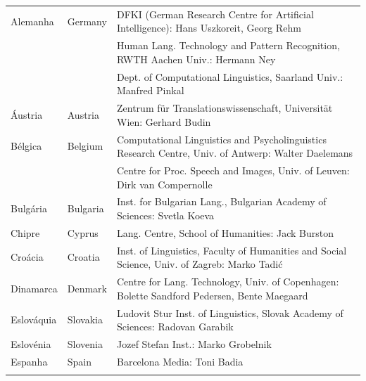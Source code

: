 \cleardoublepage

\appendix
{}



  
\cleardoublepage

\label{metanetmembers}

\small
\begin{longtable}{llp{105mm}}
  Alemanha & \textcolor{grey1}{Germany} & DFKI (German Research Centre for Artificial Intelligence): Hans Uszkoreit, Georg Rehm \\ \addlinespace
  & & Human Lang. Technology and Pattern Recognition, RWTH Aachen Univ.: Hermann Ney \\ \addlinespace
  & & Dept. of Computational Linguistics, Saarland Univ.: Manfred Pinkal \\ \addlinespace 
  Áustria & \textcolor{grey1}{Austria} & Zentrum für Translationswissenschaft, Universität Wien: Gerhard Budin \\ \addlinespace 
  Bélgica & \textcolor{grey1}{Belgium} & Computational Linguistics and Psycholinguistics Research Centre, Univ. of Antwerp: Walter Daelemans \\ \addlinespace
  & & Centre for Proc. Speech and Images, Univ. of Leuven: Dirk van Compernolle \\ \addlinespace
  Bulgária & \textcolor{grey1}{Bulgaria} & Inst. for Bulgarian Lang., Bulgarian Academy of Sciences: Svetla Koeva \\ \addlinespace
  Chipre & \textcolor{grey1}{Cyprus} & Lang. Centre, School of Humanities: Jack Burston \\ \addlinespace
  Croácia & \textcolor{grey1}{Croatia} & Inst. of Linguistics, Faculty of Humanities and Social Science, Univ. of Zagreb: Marko Tadić \\ \addlinespace
  Dinamarca &  \textcolor{grey1}{Denmark} & Centre for Lang. Technology, Univ. of Copenhagen: Bolette Sandford Pedersen, Bente Maegaard \\ \addlinespace
  Eslováquia & \textcolor{grey1}{Slovakia} & Ludovit Stur Inst. of Linguistics, Slovak Academy of Sciences: Radovan Garabik \\ \addlinespace 
  Eslovénia & \textcolor{grey1}{Slovenia} & Jozef Stefan Inst.: Marko Grobelnik \\ \addlinespace 
  Espanha & \textcolor{grey1}{Spain} & Barcelona Media: Toni Badia \\ \addlinespace 

\end{longtable}
